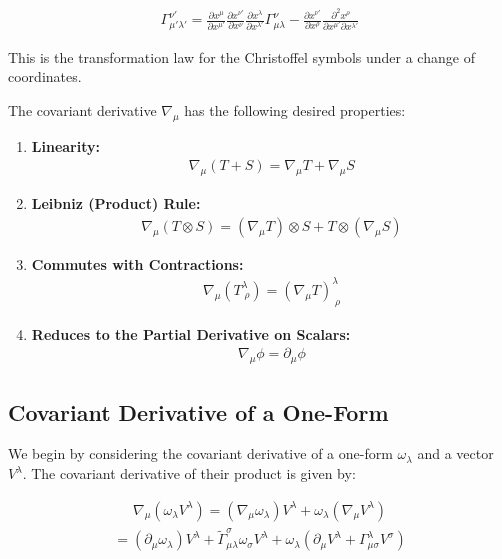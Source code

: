 \documentclass[11pt,letterpaper]{book}
\begin{document}
\begin{align}
\Gamma^{\nu'}_{\mu'\lambda'} = \frac{\partial x^\mu}{\partial x^{\mu'}} \frac{\partial x^{\nu'}}{\partial x^\nu} \frac{\partial x^\lambda}{\partial x^{\lambda'}} \Gamma^\nu_{\mu\lambda} - \frac{\partial x^{\nu'}}{\partial x^\rho} \frac{\partial^2 x^\rho}{\partial x^{\mu'} \partial x^{\lambda'}}
\end{align}

This is the transformation law for the Christoffel symbols under a change of coordinates.


The covariant derivative \( \nabla_\mu \) has the following desired properties:

\begin{enumerate}
    \item \textbf{Linearity:} 
    \begin{align}
    \nabla_\mu (T + S) = \nabla_\mu T + \nabla_\mu S
    \end{align}
    
    \item \textbf{Leibniz (Product) Rule:} 
    \begin{align}
    \nabla_\mu (T \otimes S) = (\nabla_\mu T) \otimes S + T \otimes (\nabla_\mu S)
    \end{align}
    
    \item \textbf{Commutes with Contractions:} 
    \begin{align}
    \nabla_\mu (T^\lambda_{\;\rho}) = (\nabla_\mu T)^\lambda_{\;\rho}
    \end{align}
    
    \item \textbf{Reduces to the Partial Derivative on Scalars:} 
    \begin{align}
    \nabla_\mu \phi = \partial_\mu \phi
    \end{align}
\end{enumerate}

\subsection{Covariant Derivative of a One-Form}

We begin by considering the covariant derivative of a one-form \( \omega_\lambda \) and a vector \( V^\lambda \). The covariant derivative of their product is given by:

\begin{align}
\nabla_\mu (\omega_\lambda V^\lambda) = (\nabla_\mu \omega_\lambda) V^\lambda + \omega_\lambda (\nabla_\mu V^\lambda)
\end{align}
\begin{align}
= (\partial_\mu \omega_\lambda) V^\lambda + \tilde{\Gamma}^\sigma_{\mu\lambda} \omega_\sigma V^\lambda + \omega_\lambda (\partial_\mu V^\lambda + \Gamma^\lambda_{\mu\sigma} V^\sigma)
\end{align}
\end{document}
